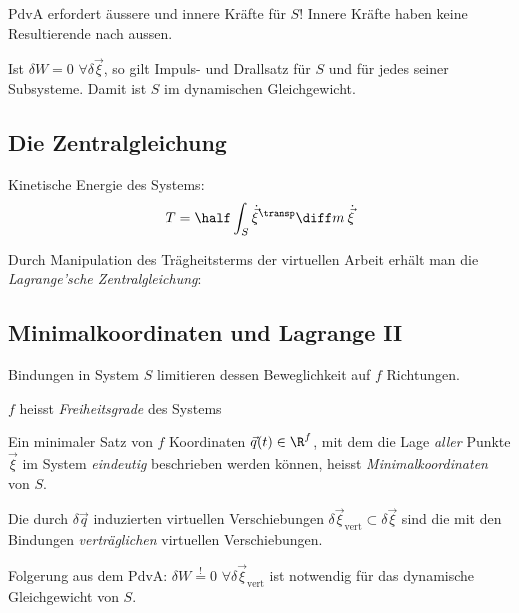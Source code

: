 		PdvA erfordert äussere und innere Kräfte für $S$! Innere Kräfte haben keine Resultierende nach aussen.
		
		\begin{satz}
			Ist $\delta W = 0$ $\forall \delta \vec \xi$, so gilt Impuls- und Drallsatz für $S$ und für jedes seiner Subsysteme. Damit ist $S$ im dynamischen Gleichgewicht.
		\end{satz}
	
	\subsection{Die Zentralgleichung} %
		Kinetische Energie des Systems:
		\[
			T = \half \int_S \dot{\vec\xi}^\transp \diff m \: \dot{\vec\xi}
		\]
		
		Durch Manipulation des Trägheitsterms der virtuellen Arbeit erhält man die \emph{Lagrange'sche Zentralgleichung}:
	
	\subsection{Minimalkoordinaten und Lagrange II} %
		Bindungen in System $S$ limitieren dessen Beweglichkeit auf $f$ Richtungen.
		
		\begin{definition}
			$f$ heisst \emph{Freiheitsgrade} des Systems
		\end{definition}
		
		\begin{definition}
			Ein minimaler Satz von $f$ Koordinaten $\vec q(t) \in \R^f$, mit dem die Lage \emph{aller} Punkte $\vec\xi$ im System \emph{eindeutig} beschrieben werden können, heisst \emph{Minimalkoordinaten} von $S$.
		\end{definition}
		
		\begin{definition}
			Die durch $\delta\vec q$ induzierten virtuellen Verschiebungen $\delta \vec \xi_\text{vert} \subset \delta\vec\xi$ sind die mit den Bindungen \emph{verträglichen} virtuellen Verschiebungen.
		\end{definition}
		
		Folgerung aus dem PdvA: $\delta W \stackrel{!}{=} 0$ $\forall \delta\vec\xi_\text{vert}$ ist notwendig für das dynamische Gleichgewicht von $S$.
		

